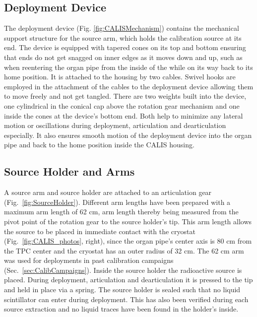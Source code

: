 \subsection{Deployment Device}
The deployment device (Fig. \ref{fig:CALISMechanism}) contains the mechanical support structure for the source arm, which holds the calibration source at its end. The device is equipped with tapered cones on its top and bottom ensuring that ends do not get snagged on inner edges as it moves down and up, such as when reentering the organ pipe from the inside of the \lsv while on its way back to its home position. It is attached to the housing by two cables. Swivel hooks are employed in the attachment of the cables to the deployment device allowing them to move freely and not get tangled. 
There are two weights built into the device, one cylindrical in the conical cap above the rotation gear mechanism and one inside the cones at the device's bottom end. Both help to minimize any lateral motion or oscillations during deployment, articulation and dearticulation especially. It also ensures smooth motion of the deployment device into the organ pipe and back to the home position inside the CALIS housing.

\subsection{Source Holder and Arms}
A source arm and source holder are attached to an articulation gear (Fig.~\ref{fig:SourceHolder}). Different arm lengths have been prepared with a maximum arm length of 62 cm, arm length thereby being measured from the pivot point of the rotation gear to the source holder's tip. This arm length allows the source to be placed in immediate contact with the cryostat (Fig.~\ref{fig:CALIS_photos}, right), since the organ pipe's center axis is 80 cm from the TPC center and the cryostat has an outer radius of 32 cm. The 62 cm arm was used for deployments in past calibration campaigns (Sec.~\ref{sec:CalibCampaigns}). Inside the source holder the radioactive source is placed. During deployment, articulation and dearticulation it is pressed to the tip and held in place via a spring. The source holder is sealed such that no liquid scintillator can enter during deployment. This has also been verified during each source extraction and no liquid traces have been found in the holder's inside.

